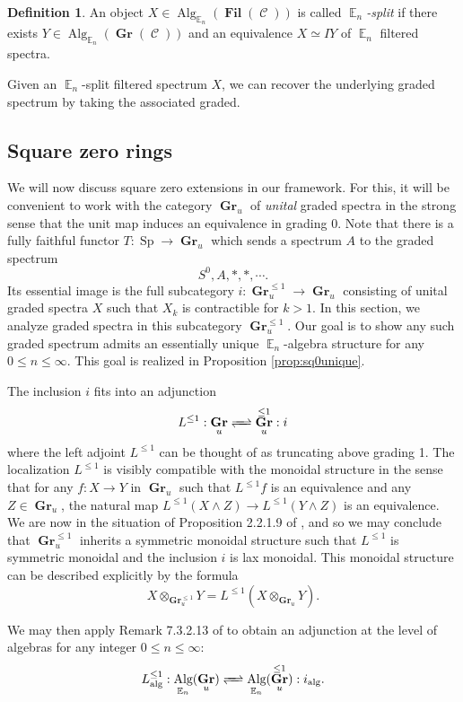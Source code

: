 \documentclass[reqno, oneside]{amsart}
\theoremstyle{definition}
\newtheorem{dfn}[nul]{Definition}
\theoremstyle{plain}
\DeclareMathOperator{\C}{\mathcal{C}}
\DeclareMathOperator{\E}{\mathbb{E}}
\DeclareMathOperator{\Gr}{\textbf{Gr}}
\DeclareMathOperator{\Fil}{\textbf{Fil}}
\DeclareMathOperator{\Alg}{\text{Alg}}
\DeclareMathOperator{\Sp}{\text{Sp}}
\begin{document}
\begin{dfn}
An object $X\in \Alg_{\E_n}(\Fil(\C))$ is called \emph{$\E_n$-split} if there exists $Y\in \Alg_{\E_n}(\Gr(\C))$ and an equivalence $X \simeq IY$ of $\E_n$ filtered spectra.  
\end{dfn}

Given an $\E_n$-split filtered spectrum $X$, we can recover the underlying graded spectrum by taking the associated graded. 

\subsection{Square zero rings}

We will now discuss square zero extensions in our framework.  For this, it will be convenient to work with the category $\Gr_u$ of \emph{unital} graded spectra in the strong sense that the unit map induces an equivalence in grading 0.  
Note that there is a fully faithful functor $T:\Sp \to \Gr_u$ which sends a spectrum $A$ to the graded spectrum $$S^0, A, *, *, \cdots.$$  Its essential image is the full subcategory $i: \Gr^{\leq 1}_u \to \Gr_u$ consisting of unital graded spectra $X$ such that $X_k$ is contractible for $k>1$.  In this section, we analyze graded spectra in this subcategory $\Gr^{\leq 1}_u$. Our goal is to show any such graded spectrum admits an essentially unique $\E_n$-algebra structure for any $0\leq n\leq \infty.$  This goal is realized in Proposition \ref{prop:sq0unique}.  


The inclusion $i$ fits into an adjunction
$$L^{\leq 1}:  \Gr_u \xrightleftharpoons{\quad} \Gr_u^{\leq 1} : i$$ where the left adjoint $L^{\leq 1}$ can be thought of as truncating above grading 1.  The localization $L^{\leq 1}$ is visibly compatible with the monoidal structure in the sense that for any $f:X\to Y$ in $\Gr_u$ such that $L^{\leq 1}f$ is an equivalence and any $Z\in \Gr_u$, the natural map $L^{\leq 1} (X\wedge Z) \to L^{\leq 1}(Y\wedge Z)$ is an equivalence.  We are now in the situation of Proposition 2.2.1.9 of \cite{HA}, and so we may conclude that $\Gr_u^{\leq 1}$ inherits a symmetric monoidal structure such that $L^{\leq 1}$ is symmetric monoidal and the inclusion $i$ is lax monoidal.  This monoidal structure can be described explicitly by the formula $$X \otimes_{\Gr_u^{\leq 1}} Y = L^{\leq 1}(X \otimes_{\Gr_u} Y).$$

We may then apply Remark 7.3.2.13 of \cite{HA} to obtain an adjunction at the level of algebras for any integer $0\leq n\leq \infty$:
$$L^{\leq 1}_{\text{alg}}: \Alg_{\E_n}( \Gr_u)  \xrightleftharpoons{\quad} \Alg_{\E_n}(\Gr_u^{\leq 1}) : i_{\text{alg}}.$$
\end{document}
